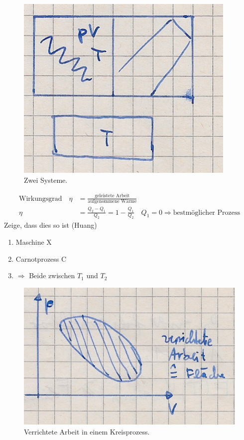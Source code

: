 \begin{figure}[H]
  \centering
  \includegraphics[width = \textwidth]{Zeichnungen/23.pdf}
  \caption{Zwei Systeme.}
\end{figure}
\begin{align}
    \text{Wirkungsgrad} \quad  \eta &= \frac{\text{geleistete Arbeit}}{\text{aufgenommene Wärme}}\\
    \eta &= \frac{Q_2 - Q_1}{Q_2} = 1- \frac{Q_1}{Q_2} \quad Q_1 = 0 \Rightarrow \text{bestmöglicher Prozess}
\end{align}
Zeige, dass dies so ist (Huang)
\begin{enumerate}
    \item Maschine X
    \item Carnotprozess C
    \item $\Rightarrow$ Beide zwischen $T_1$ und $T_2$
\end{enumerate}
\begin{figure}[H]
  \centering
  \includegraphics[width = \textwidth]{Zeichnungen/24.pdf}
  \caption{Verrichtete Arbeit in einem Kreisprozess.}
\end{figure}
